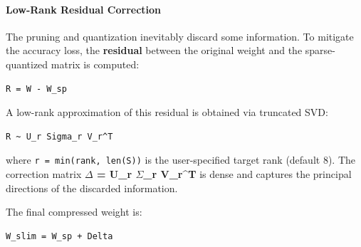 \paragraph{Low-Rank Residual Correction}

The pruning and quantization inevitably discard some information. To mitigate the accuracy loss, the \textbf{residual} between the original weight and the sparse-quantized matrix is computed:

\vspace{0.5em}
\begin{mdframed}[backgroundcolor=codebg, linecolor=codeframe, linewidth=1pt, roundcorner=4pt, innerleftmargin=2pt, innerrightmargin=5pt, innertopmargin=5pt, innerbottommargin=5pt]
\begin{lstlisting}
R = W - W_sp
\end{lstlisting}
\end{mdframed}
\vspace{0.5em}

A low-rank approximation of this residual is obtained via truncated SVD:

\vspace{0.5em}
\begin{mdframed}[backgroundcolor=codebg, linecolor=codeframe, linewidth=1pt, roundcorner=4pt, innerleftmargin=2pt, innerrightmargin=5pt, innertopmargin=5pt, innerbottommargin=5pt]
\begin{lstlisting}
R ~ U_r Sigma_r V_r^T
\end{lstlisting}
\end{mdframed}
\vspace{0.5em}

where \texttt{r = min(rank, len(S))} is the user-specified target rank (default 8). The correction matrix \textbf{$\Delta$ = U\_r $\Sigma$\_r V\_r\textasciicircum{}T} is dense and captures the principal directions of the discarded information.

The final compressed weight is:

\vspace{0.5em}
\begin{mdframed}[backgroundcolor=codebg, linecolor=codeframe, linewidth=1pt, roundcorner=4pt, innerleftmargin=2pt, innerrightmargin=5pt, innertopmargin=5pt, innerbottommargin=5pt]
\begin{lstlisting}
W_slim = W_sp + Delta
\end{lstlisting}
\end{mdframed}
\vspace{0.5em}


